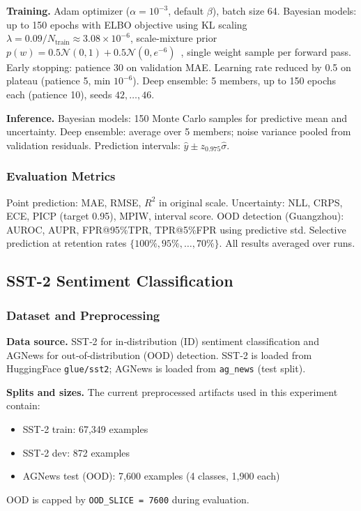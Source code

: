 \documentclass{article}
\theoremstyle{plain}
\theoremstyle{definition}
\theoremstyle{remark}
\begin{document}
\textbf{Training.} Adam optimizer ($\alpha=10^{-3}$, default $\beta$), batch size 64. Bayesian models: up to 150 epochs with ELBO objective using KL scaling $\lambda = 0.09/N_{\mathrm{train}} \approx 3.08 \times 10^{-6}$, scale-mixture prior $p(w) = 0.5\mathcal{N}(0,1) + 0.5\mathcal{N}(0,e^{-6})$~\cite{blundell2015weight}, single weight sample per forward pass. Early stopping: patience 30 on validation MAE. Learning rate reduced by 0.5 on plateau (patience 5, min $10^{-6}$). Deep ensemble: 5 members, up to 150 epochs each (patience 10), seeds $42,\ldots,46$.

\textbf{Inference.} Bayesian models: 150 Monte Carlo samples for predictive mean and uncertainty. Deep ensemble: average over 5 members; noise variance pooled from validation residuals. Prediction intervals: $\hat{y} \pm z_{0.975} \hat{\sigma}$.

\subsubsection{Evaluation Metrics}

Point prediction: MAE, RMSE, $R^2$ in original scale. Uncertainty: NLL, CRPS, ECE, PICP (target 0.95), MPIW, interval score. OOD detection (Guangzhou): AUROC, AUPR, FPR@95\%TPR, TPR@5\%FPR using predictive std. Selective prediction at retention rates $\{100\%, 95\%, \ldots, 70\%\}$. All results averaged over runs.

\subsection{SST-2 Sentiment Classification}\label{app:exp:sst2}


\subsubsection{Dataset and Preprocessing}

\textbf{Data source.} SST‑2 for in‑distribution (ID) sentiment classification and AGNews for out‑of‑distribution (OOD) detection. SST‑2 is loaded from HuggingFace \texttt{glue/sst2}; AGNews is loaded from \texttt{ag\_news} (test split).

\textbf{Splits and sizes.} The current preprocessed artifacts used in this experiment contain:
\begin{itemize}
\item SST‑2 train: 67,349 examples
\item SST‑2 dev: 872 examples
\item AGNews test (OOD): 7,600 examples (4 classes, 1,900 each)
\end{itemize}
OOD is capped by \texttt{OOD\_SLICE = 7600} during evaluation.
\end{document}
